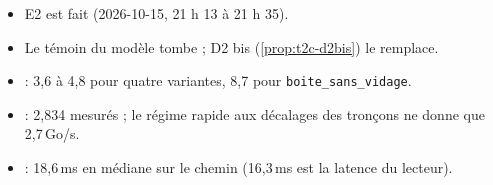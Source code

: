 \begin{itemize}
\item {} E2 est fait (2026-10-15, 21 h 13 à 21 h 35).
\item {} Le témoin du modèle tombe ; D2 bis (\cref{prop:t2c-d2bis}) le remplace.
\item {} : 3,6 à 4,8 pour quatre variantes, 8,7 pour \texttt{boite\_\allowbreak sans\_\allowbreak vidage}.
\item {} : 2,834 mesurés ; le régime rapide aux décalages des tronçons ne donne que 2,7\,Go/s.
\item {} : 18,6\,ms en médiane sur le chemin (16,3\,ms est la latence du lecteur).
\end{itemize}

